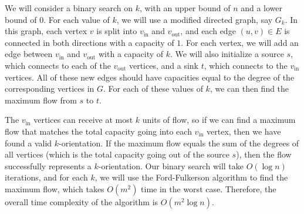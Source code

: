 \documentclass{article}
\begin{document}
\begin{solution}
We will consider a binary search on $k$, with an upper bound of $n$ and a lower bound of $0$. For each value of $k$, we will use a modified directed graph, say $G_k$. In this graph, each vertex $v$ is split into $v_\text{in}$ and $v_\text{out}$, and each edge $(u,v) \in E$ is connected in both directions with a capacity of $1$. For each vertex, we will add an edge between $v_\text{in}$ and $v_\text{out}$ with a capacity of $k$. We will also initialize a source $s$, which connects to each of the $v_\text{out}$ vertices, and a sink $t$, which connects to the $v_\text{in}$ vertices. All of these new edges should have capacities equal to the degree of the corresponding vertices in $G$. For each of these values of $k$, we can then find the maximum flow from $s$ to $t$.

The $v_\text{in}$ vertices can receive at most $k$ units of flow, so if we can find a maximum flow that matches the total capacity going into each $v_\text{in}$ vertex, then we have found a valid $k$-orientation. If the maximum flow equals the sum of the degrees of all vertices (which is the total capacity going out of the source $s$), then the flow successfully represents a $k$-orientation. Our binary search will take $O(\log n)$ iterations, and for each $k$, we will use the Ford-Fulkerson algorithm to find the maximum flow, which takes $O(m^2)$ time in the worst case. Therefore, the overall time complexity of the algorithm is $O(m^2 \log n)$.
\end{solution}
\end{document}
